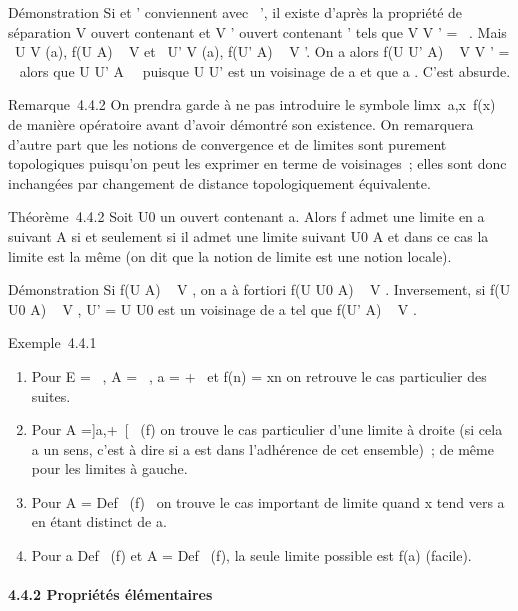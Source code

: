 Démonstration Si \ell et \ell' conviennent avec \ell\neq~\ell', il existe d'après la
propriété de séparation V ouvert contenant \ell et V ' ouvert contenant \ell'
tels que V \bigcap V ' = \varnothing~. Mais \exists~U \in V (a), f(U \bigcap
A) \subset~ V et \exists~U' \in V (a), f(U' \bigcap A) \subset~ V '. On a
alors f(U \bigcap U' \bigcap A) \subset~ V \bigcap V ' = \varnothing~ alors que U \bigcap U' \bigcap
A\neq~\varnothing~ puisque U \bigcap U' est un voisinage de a et
que a \in\overlineA. C'est absurde.

Remarque~4.4.2 On prendra garde à ne pas introduire le symbole
limx\rightarrow~a,x\inA~f(x) de manière opératoire
avant d'avoir démontré son existence. On remarquera d'autre part que les
notions de convergence et de limites sont purement topologiques
puisqu'on peut les exprimer en terme de voisinages~; elles sont donc
inchangées par changement de distance topologiquement équivalente.

Théorème~4.4.2 Soit U0 un ouvert contenant a. Alors f admet
une limite en a suivant A si et seulement si il admet une limite suivant
U0 \bigcap A et dans ce cas la limite est la même (on dit que la
notion de limite est une notion locale).

Démonstration Si f(U \bigcap A) \subset~ V , on a à fortiori f(U \bigcap U0 \bigcap A)
\subset~ V . Inversement, si f(U \bigcap U0 \bigcap A) \subset~ V , U' = U \bigcap
U0 est un voisinage de a tel que f(U' \bigcap A) \subset~ V .

Exemple~4.4.1

\begin{enumerate}
\itemsep1pt\parskip0pt
\item
  Pour E = \overline{}~, A = ~, a = +\infty~ et f(n) =
  xn on retrouve le cas particulier des suites.
\item
  Pour A ={]}a,+\infty~{[}\bigcapDef~ (f) on trouve le cas
  particulier d'une limite à droite (si cela a un sens, c'est à dire si
  a est dans l'adhérence de cet ensemble)~; de même pour les limites à
  gauche.
\item
  Pour A = Def~ (f)
  \diagdown\a\ on trouve le cas important de
  limite quand x tend vers a en étant distinct de a.
\item
  Pour a \in Def~ (f) et A
  = Def~ (f), la seule limite possible est f(a)
  (facile).
\end{enumerate}

\paragraph{4.4.2 Propriétés élémentaires}

